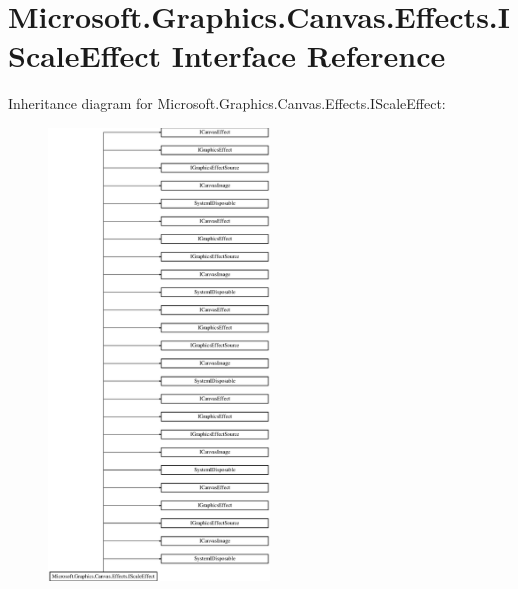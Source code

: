 \hypertarget{interface_microsoft_1_1_graphics_1_1_canvas_1_1_effects_1_1_i_scale_effect}{}\section{Microsoft.\+Graphics.\+Canvas.\+Effects.\+I\+Scale\+Effect Interface Reference}
\label{interface_microsoft_1_1_graphics_1_1_canvas_1_1_effects_1_1_i_scale_effect}
Inheritance diagram for Microsoft.\+Graphics.\+Canvas.\+Effects.\+I\+Scale\+Effect\+:\begin{figure}[H]
\begin{center}
\leavevmode
\includegraphics[height=12.000000cm]{interface_microsoft_1_1_graphics_1_1_canvas_1_1_effects_1_1_i_scale_effect}
\end{center}
\end{figure}
